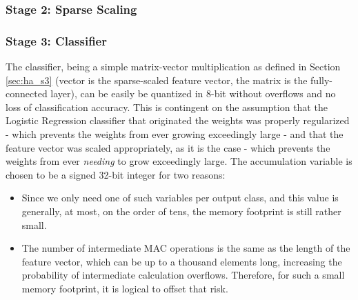 
        \subsubsection{Stage 2: Sparse Scaling}\label{sec:im_nanohydra_qnt_s2}

        \subsubsection{Stage 3: Classifier}\label{sec:im_nanohydra_qnt_s3}

        The classifier, being a simple matrix-vector multiplication as defined in Section \ref{sec:ha_s3} (vector is the sparse-scaled feature vector, the matrix is the fully-connected layer), can be easily
        be quantized in 8-bit without overflows and no loss of classification accuracy. This is contingent on the assumption that the Logistic Regression classifier that originated the weights was properly 
        regularized - which prevents the weights from ever growing exceedingly large - and that the feature vector was scaled appropriately, as it is the case - which prevents the weights from ever \emph{needing}
        to grow exceedingly large. The accumulation variable is chosen to be a signed 32-bit integer for two reasons:
        
        \begin{itemize}
            \item Since we only need one of such variables per output class, and this value is generally, at most, on the order of tens, the memory footprint is still rather small. 
            \item The number of intermediate MAC operations is the same as the length of the feature vector, which can be up to a thousand elements long, increasing the probability of intermediate calculation
                  overflows. Therefore, for such a small memory footprint, it is logical to offset that risk.
        \end{itemize}

